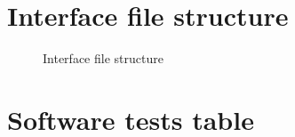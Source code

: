 \documentclass{article}
\begin{document}
\section{Interface file structure} \label{sec:appendix-interface-struct}
\begin{figure}[!htb]
	\caption{\label{fig:interface-struct} Interface file structure}
\end{figure}


\section{Software tests table}\label{sec:appendix-software-tests}
\end{document}
